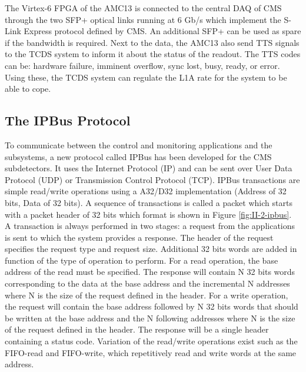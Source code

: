       The Virtex-6 FPGA of the AMC13 is connected to the central DAQ of CMS through the two SFP+ optical links running at 6 Gb/s which implement the S-Link Express protocol defined by CMS. An additional SFP+ can be used as spare if the bandwidth is required. Next to the data, the AMC13 also send TTS signals to the TCDS system to inform it about the status of the readout. The TTS codes can be: hardware failure, imminent overflow, sync lost, busy, ready, or error. Using these, the TCDS system can regulate the L1A rate for the system to be able to cope.

    \subsection{The IPBus Protocol}

      To communicate between the control and monitoring applications and the subsystems, a new protocol called IPBus has been developed for the CMS subdetectors. It uses the Internet Protocol (IP) and can be sent over User Data Protocol (UDP) or Transmission Control Protocol (TCP). IPBus transactions are simple read/write operations using a A32/D32 implementation (Address of 32 bits, Data of 32 bits). A sequence of transactions is called a packet which starts with a packet header of 32 bits which format is shown in Figure \ref{fig:II-2-ipbus}. \\

      A transaction is always performed in two stages: a request from the applications is sent to which the system provides a response. The header of the request specifies the request type and request size. Additional 32 bits words are added in function of the type of operation to perform. For a read operation, the base address of the read must be specified. The response will contain N 32 bits words corresponding to the data at the base address and the incremental N addresses where N is the size of the request defined in the header. For a write operation, the request will contain the base address followed by N 32 bits words that should be written at the base address and the N following addresses where N is the size of the request defined in the header. The response will be a single header containing a status code. Variation of the read/write operations exist such as the FIFO-read and FIFO-write, which repetitively read and write words at the same address. \\

